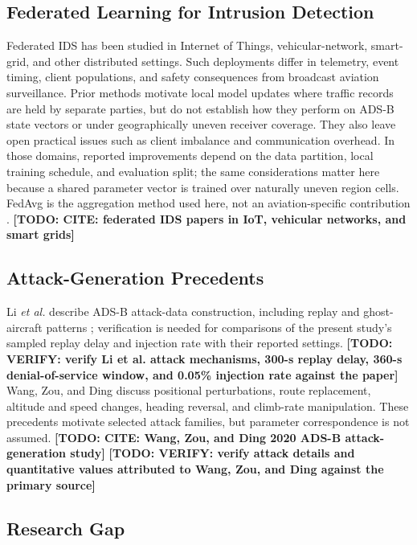 \documentclass[conference]{IEEEtran}
\newcommand{\todo}[1]{\textbf{[TODO: #1]}}
\begin{document}
\subsection{Federated Learning for Intrusion Detection}

Federated IDS has been studied in Internet of Things, vehicular-network, smart-grid, and other distributed settings. Such deployments differ in telemetry, event timing, client populations, and safety consequences from broadcast aviation surveillance. Prior methods motivate local model updates where traffic records are held by separate parties, but do not establish how they perform on ADS-B state vectors or under geographically uneven receiver coverage. They also leave open practical issues such as client imbalance and communication overhead. In those domains, reported improvements depend on the data partition, local training schedule, and evaluation split; the same considerations matter here because a shared parameter vector is trained over naturally uneven region cells. FedAvg is the aggregation method used here, not an aviation-specific contribution \cite{mcmahan2017}. \todo{CITE: federated IDS papers in IoT, vehicular networks, and smart grids}

\subsection{Attack-Generation Precedents}

Li \emph{et al.} describe ADS-B attack-data construction, including replay and ghost-aircraft patterns \cite{li2020}; verification is needed for comparisons of the present study's sampled replay delay and injection rate with their reported settings. \todo{VERIFY: verify Li et al. attack mechanisms, 300-s replay delay, 360-s denial-of-service window, and 0.05\% injection rate against the paper} Wang, Zou, and Ding discuss positional perturbations, route replacement, altitude and speed changes, heading reversal, and climb-rate manipulation. These precedents motivate selected attack families, but parameter correspondence is not assumed. \todo{CITE: Wang, Zou, and Ding 2020 ADS-B attack-generation study} \todo{VERIFY: verify attack details and quantitative values attributed to Wang, Zou, and Ding against the primary source}



\subsection{Research Gap}
\end{document}
